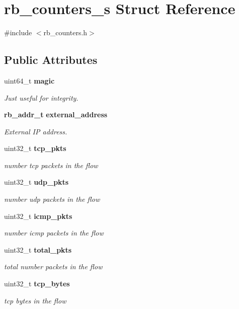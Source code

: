 \section{rb\+\_\+counters\+\_\+s Struct Reference}
\label{structrb__counters__s}


{\ttfamily \#include $<$rb\+\_\+counters.\+h$>$}

\subsection*{Public Attributes}
\begin{DoxyCompactItemize}
\item 
uint64\+\_\+t {\bf magic}
\begin{DoxyCompactList}\small\item\em Just useful for integrity. \end{DoxyCompactList}\item 
{\bf rb\+\_\+addr\+\_\+t} {\bf external\+\_\+address}
\begin{DoxyCompactList}\small\item\em External I\+P address. \end{DoxyCompactList}\item 
uint32\+\_\+t {\bf tcp\+\_\+pkts}
\begin{DoxyCompactList}\small\item\em number tcp packets in the flow \end{DoxyCompactList}\item 
uint32\+\_\+t {\bf udp\+\_\+pkts}
\begin{DoxyCompactList}\small\item\em number udp packets in the flow \end{DoxyCompactList}\item 
uint32\+\_\+t {\bf icmp\+\_\+pkts}
\begin{DoxyCompactList}\small\item\em number icmp packets in the flow \end{DoxyCompactList}\item 
uint32\+\_\+t {\bf total\+\_\+pkts}
\begin{DoxyCompactList}\small\item\em total number packets in the flow \end{DoxyCompactList}\item 
uint32\+\_\+t {\bf tcp\+\_\+bytes}
\begin{DoxyCompactList}\small\item\em tcp bytes in the flow \end{DoxyCompactList}\item 

\end{DoxyCompactItemize}
